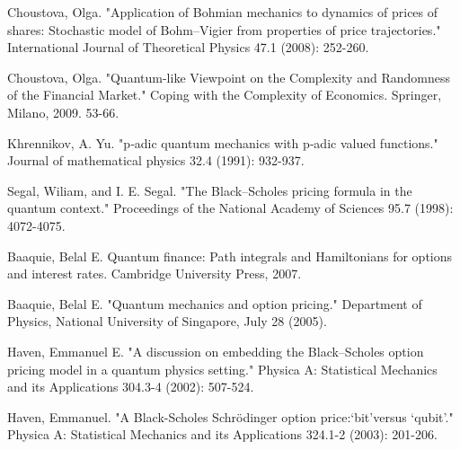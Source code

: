 \documentclass[a4paper,titlepage,12pt,fleqn,oneside]{report}
\begin{document}
\begin{thebibliography}{99}
\begin{LTRitems}
	Choustova, Olga. "Application of Bohmian mechanics to dynamics of prices of shares: Stochastic model of Bohm–Vigier from properties of price trajectories." International Journal of Theoretical Physics 47.1 (2008): 252-260.
\end{LTRitems}

\begin{LTRitems}
	Choustova, Olga. "Quantum-like Viewpoint on the Complexity and Randomness of the Financial Market." Coping with the Complexity of Economics. Springer, Milano, 2009. 53-66.
\end{LTRitems}

\begin{LTRitems}
	Khrennikov, A. Yu. "p‐adic quantum mechanics with p‐adic valued functions." Journal of mathematical physics 32.4 (1991): 932-937.
\end{LTRitems}

\begin{LTRitems}
	Segal, Wiliam, and I. E. Segal. "The Black–Scholes pricing formula in the quantum context." Proceedings of the National Academy of Sciences 95.7 (1998): 4072-4075.
\end{LTRitems}

\begin{LTRitems}
	Baaquie, Belal E. Quantum finance: Path integrals and Hamiltonians for options and interest rates. Cambridge University Press, 2007.
\end{LTRitems}

\begin{LTRitems}
	Baaquie, Belal E. "Quantum mechanics and option pricing." Department of Physics, National University of Singapore, July 28 (2005).
\end{LTRitems}

\begin{LTRitems}
	Haven, Emmanuel E. "A discussion on embedding the Black–Scholes option pricing model in a quantum physics setting." Physica A: Statistical Mechanics and its Applications 304.3-4 (2002): 507-524.
\end{LTRitems}

\begin{LTRitems}
	Haven, Emmanuel. "A Black-Scholes Schrödinger option price:‘bit’versus ‘qubit’." Physica A: Statistical Mechanics and its Applications 324.1-2 (2003): 201-206.
\end{LTRitems}


\end{thebibliography}
\end{document}
